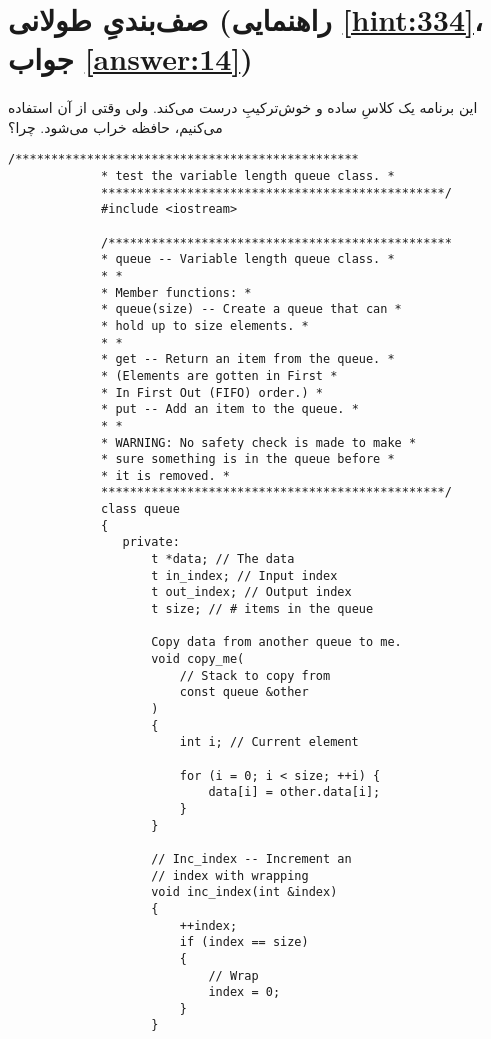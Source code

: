 \section[صف‌بندیِ طولانی]{صف‌بندیِ طولانی \protect{} (راهنمایی \ref{hint:334}، جواب \ref{answer:14})}
\paragraph{}\label{prog:85}
این برنامه یک کلاسِ ساده و خوش‌ترکیبِ  درست می‌کند. ولی وقتی از آن استفاده می‌کنیم، حافظه خراب می‌شود. چرا؟

\begin{LTR}
        \begin{lstlisting}[style=C++Style]
             /************************************************
             * test the variable length queue class. *
             ************************************************/
             #include <iostream>

             /************************************************
             * queue -- Variable length queue class. *
             * *
             * Member functions: *
             * queue(size) -- Create a queue that can *
             * hold up to size elements. *
             * *
             * get -- Return an item from the queue. *
             * (Elements are gotten in First *
             * In First Out (FIFO) order.) *
             * put -- Add an item to the queue. *
             * *
             * WARNING: No safety check is made to make *
             * sure something is in the queue before *
             * it is removed. *
             ************************************************/
             class queue
             {
             	private:
             		t *data; // The data
             		t in_index; // Input index
             		t out_index; // Output index
             		t size; // # items in the queue

             		Copy data from another queue to me.
             		void copy_me(
             			// Stack to copy from
             			const queue &other
             		)
             		{
             			int i; // Current element

             			for (i = 0; i < size; ++i) {
             				data[i] = other.data[i];
             			}
             		}

             		// Inc_index -- Increment an
             		// index with wrapping
             		void inc_index(int &index)
             		{
             			++index;
             			if (index == size)
             			{
             				// Wrap
             				index = 0;
             			}
             		}


\end{lstlisting}
\end{LTR}
